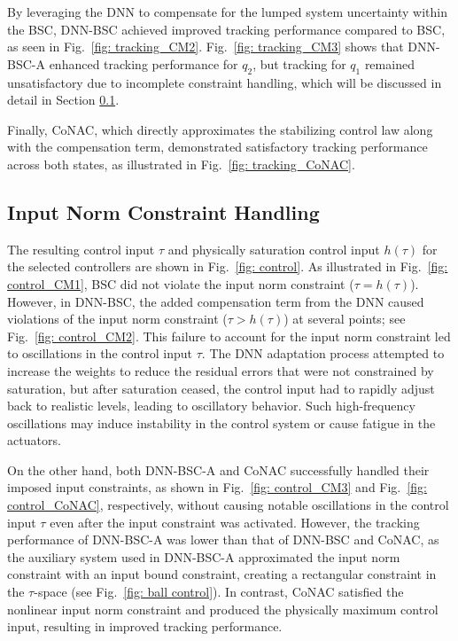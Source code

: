 \documentclass[lettersize,journal]{IEEEtran}
\begin{document}
By leveraging the DNN to compensate for the lumped system uncertainty within the BSC, DNN-BSC achieved improved tracking performance compared to BSC, as seen in Fig.~\ref{fig: tracking_CM2}. Fig.~\ref{fig: tracking_CM3} shows that DNN-BSC-A enhanced tracking performance for $q_2$, but tracking for $q_1$ remained unsatisfactory due to incomplete constraint handling, which will be discussed in detail in Section \ref{sec:sim_cnst}.

Finally, CoNAC, which directly approximates the stabilizing control law along with the compensation term, demonstrated satisfactory tracking performance across both states, as illustrated in Fig.~\ref{fig: tracking_CoNAC}.

\subsection{Input Norm Constraint Handling}\label{sec:sim_cnst}

The resulting control input $\tau$ and physically saturation control input $h(\tau)$ for the selected controllers are shown in Fig.~\ref{fig: control}. As illustrated in Fig.~\ref{fig: control_CM1}, BSC did not violate the input norm constraint (\ie $\tau = h(\tau)$). However, in DNN-BSC, the added compensation term from the DNN caused violations of the input norm constraint (\ie $\tau > h(\tau)$) at several points; see Fig.~\ref{fig: control_CM2}. This failure to account for the input norm constraint led to oscillations in the control input $\tau$. The DNN adaptation process attempted to increase the weights to reduce the residual errors that were not constrained by saturation, but after saturation ceased, the control input had to rapidly adjust back to realistic levels, leading to oscillatory behavior. Such high-frequency oscillations may induce instability in the control system or cause fatigue in the actuators.

On the other hand, both DNN-BSC-A and CoNAC successfully handled their imposed input constraints, as shown in Fig.~\ref{fig: control_CM3} and Fig.~\ref{fig: control_CoNAC}, respectively, without causing notable oscillations in the control input $\tau$ even after the input constraint was activated. However, the tracking performance of DNN-BSC-A was lower than that of DNN-BSC and CoNAC, as the auxiliary system used in DNN-BSC-A approximated the input norm constraint with an input bound constraint, creating a rectangular constraint in the $\tau$-space (see Fig.~\ref{fig: ball control}). In contrast, CoNAC satisfied the nonlinear input norm constraint and produced the physically maximum control input, resulting in improved tracking performance. 
\end{document}
